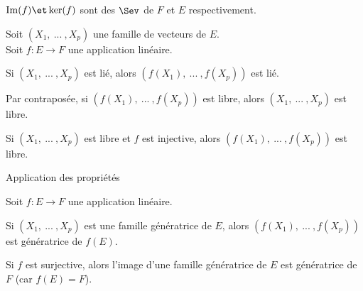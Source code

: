 \documentclass[12pt,twoside,a4paper]{article}
\begin{document}
		\begin{prop}
			$\mathrm{Im}(f)\et \ker(f)$ sont des $\Sev$ de $F$ et $E$ respectivement.
		\end{prop}
		\begin{prop}
			Soit $(X_1,\ ...\ ,X_p)$ une famille de vecteurs de $E$.\\
			Soit $f:E\rightarrow F$ une application lin\'eaire.
			\begin{liste}
				\item Si $(X_1,\ ...\ ,X_p)$ est li\'e, alors $(f(X_1),\ ...\ ,f(X_p))$ est li\'e.
				\item Par contrapos\'ee, si $(f(X_1),\ ...\ ,f(X_p))$ est libre, alors $(X_1,\ ...\ ,X_p)$ est libre.
				\item Si $(X_1,\ ...\ ,X_p)$ est libre et $f$ est injective, alors $(f(X_1),\ ...\ ,f(X_p))$ est libre.
			\end{liste}
		\end{prop}
		\begin{preuve}
			Application des propri\'et\'es
		\end{preuve}
		\newpage
		\begin{prop}
			Soit $f:E\rightarrow F$ une application lin\'eaire.
			\begin{liste}
				\item Si $(X_1,\ ...\ ,X_p)$ est une famille g\'en\'eratrice de $E$, alors $(f(X_1),\ ...\ ,f(X_p))$ est g\'en\'eratrice de $f(E)$.
				\item Si $f$ est surjective, alors l'image d'une famille g\'en\'eratrice de $E$ est g\'en\'eratrice de $F$ (car $f(E)=F$).
			\end{liste}
		\end{prop}
\end{document}
